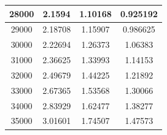\begin{center}
\begin{tabular}{| c | c | c | c |}
28000 & 2.1594 & 1.10168 & 0.925192 \\ \hline
29000 & 2.18708 & 1.15907 & 0.986625 \\ \hline
30000 & 2.22694 & 1.26373 & 1.06383 \\ \hline
31000 & 2.36625 & 1.33993 & 1.14153 \\ \hline
32000 & 2.49679 & 1.44225 & 1.21892 \\ \hline
33000 & 2.67365 & 1.53568 & 1.30066 \\ \hline
34000 & 2.83929 & 1.62477 & 1.38277 \\ \hline
35000 & 3.01601 & 1.74507 & 1.47573 \\ \hline
\hline
\end{tabular}
\end{center}
